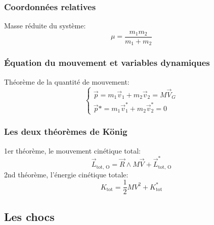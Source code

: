 \documentclass{article}
\numberwithin{equation}{section}
\begin{document}
\subsubsection{Coordonnées relatives} %
Masse réduite du système:
\begin{equation}
	\boxed{ \mu = \frac{m_1m_2}{m_1 + m_2} }
\end{equation}

\subsubsection{Équation du mouvement et variables dynamiques} %
Théorème de la quantité de mouvement:
\begin{equation}
	\begin{cases}
		\vec p = m_1 \vec v_1 + m_2 \vec v_2 = M \vec V_G \\
		\vec p * = m_1 \vec v_1^* + m_2 \vec v_2^* = 0
	\end{cases}
\end{equation}

\subsubsection{Les deux théorèmes de König}
1er théorème, le mouvement cinétique total:
\begin{equation}
	\boxed{ \vec L_\text{tot, O} = \vec R \wedge M \vec V + \vec L_\text{tot, O}^* }
\end{equation}
2nd théorème, l'énergie cinétique totale:
\begin{equation}
	K_\text{tot} = \frac{1}{2}MV^2 + K_\text{tot}^*
\end{equation}

\subsection{Les chocs}
\end{document}
